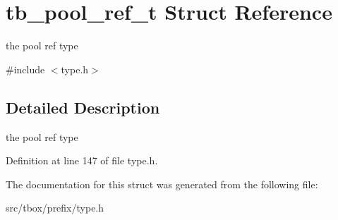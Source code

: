 \hypertarget{structtb__pool__ref__t}{\section{tb\-\_\-pool\-\_\-ref\-\_\-t Struct Reference}
\label{structtb__pool__ref__t}
}


the pool ref type  




{\ttfamily \#include $<$type.\-h$>$}



\subsection{Detailed Description}
the pool ref type 

Definition at line 147 of file type.\-h.



The documentation for this struct was generated from the following file\-:\begin{DoxyCompactItemize}
\item 
src/tbox/prefix/type.\-h\end{DoxyCompactItemize}
